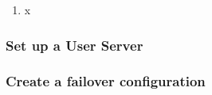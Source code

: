 \begin{enumerate}[resume*=task2methodology2]
  \item x
\end{enumerate}

\subsubsection{Set up a User Server}
\subsubsection{Create a failover configuration}
